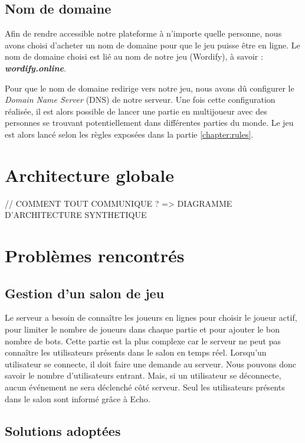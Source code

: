 \documentclass{tnreport}
\begin{document}
\subsection{Nom de domaine}

Afin de rendre accessible notre plateforme à n'importe quelle personne, nous avons choisi d'acheter un nom de domaine pour que le jeu puisse être en ligne. Le nom de domaine choisi est lié au nom de notre jeu (Wordify), à savoir : \textbf{\textit{wordify.online}}.

Pour que le nom de domaine redirige vers notre jeu, nous avons dû configurer le \textit{Domain Name Server} (DNS) de notre serveur. Une fois cette configuration réalisée, il est alors possible de lancer une partie en multijoueur avec des personnes se trouvant potentiellement dans différentes parties du monde. Le jeu est alors lancé selon les règles exposées dans la partie \ref{chapter:rules}. 

\section{Architecture globale}

\label{chapter:global_architecture}

// COMMENT TOUT COMMUNIQUE ? => DIAGRAMME D'ARCHITECTURE SYNTHETIQUE

\section{Problèmes rencontrés}
\subsection{Gestion d'un salon de jeu}
Le serveur a besoin de connaître les joueurs en lignes pour choisir le joueur actif, pour limiter le nombre de joueurs dans chaque partie et pour ajouter le bon nombre de bots. Cette partie est la plus complexe car le serveur ne peut pas connaître les utilisateurs présents dans le salon en temps réel. Lorsqu'un utilisateur se connecte, il doit faire une demande au serveur. Nous pouvons donc savoir le nombre d'utilisateurs entrant. Mais, si un utilisateur se déconnecte, aucun événement ne sera déclenché côté serveur. Seul les utilisateurs présents dans le salon sont informé grâce à Echo.\\
\subsection{Solutions adoptées}
\end{document}
